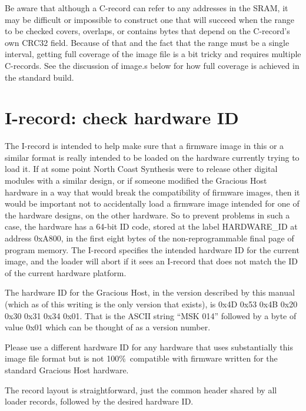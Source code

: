 Be aware that although a C-record can refer to any addresses in the SRAM, it
may be difficult or impossible to construct one that will succeed when the
range to be checked covers, overlaps, or contains bytes that depend on the
C-record's own CRC32 field.  Because of that and the fact that the range
must be a single interval, getting full coverage of the image file is a bit
tricky and requires multiple C-records.  See the discussion of image.s below
for how full coverage is achieved in the standard build.

\section{I-record: check hardware ID}

The I-record is intended to help make sure that a firmware image in this or
a similar format is really intended to be loaded on the hardware currently
trying to load it.  If at some point North Coast Synthesis were to release
other digital modules with a similar design, or if someone modified the
Gracious Host hardware in a way that would break the compatibility of
firmware images, then it would be important not to accidentally load a
firmware image intended for one of the hardware designs, on the other
hardware.  So to prevent problems in such a case, the hardware has a 64-bit
ID code, stored at the label HARDWARE\_ID at address 0xA800, in the first
eight bytes of the non-reprogrammable final page of program memory.  The
I-record specifies the intended hardware ID for the current image, and the
loader will abort if it sees an I-record that does not match the ID
of the current hardware platform.

The hardware ID for the Gracious Host, in the version described by this
manual (which as of this writing is the only version that exists), is 0x4D
0x53 0x4B 0x20 0x30 0x31 0x34 0x01.  That is the ASCII string ``MSK 014''
followed by a byte of value 0x01 which can be thought of as a version
number.

Please use a different hardware ID for any hardware that uses substantially
this image file format but is not 100\%\ compatible with firmware written
for the standard Gracious Host hardware.

The record layout is straightforward, just the common header shared by all
loader records, followed by the desired hardware ID.


